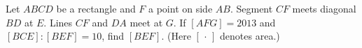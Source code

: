 Let $ABCD$ be a rectangle and $F$ a point on side $AB$. Segment $CF$ meets diagonal $BD$ at $E$. Lines $CF$ and $DA$ meet at $G$. If $[AFG]=2013$ and $[BCE]:[BEF]=10$, find $[BEF]$. (Here $[\,\cdot\,]$ denotes area.)
